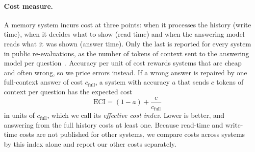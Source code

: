 \paragraph{Cost measure.}
A memory system incurs cost at three points: when it processes the history (write time), when it decides what to show (read time) and when the answering model reads what it was shown (answer time).
Only the last is reported for every system in public re-evaluations, as the number of tokens of context sent to the answering model per question~\citep{omnimemeval2026}.
Accuracy per unit of cost rewards systems that are cheap and often wrong, so we price errors instead.
If a wrong answer is repaired by one full-context answer of cost $c_\text{full}$, a system with accuracy $a$ that sends $c$ tokens of context per question has the expected cost
\begin{equation}
\label{eq:eci}
\mathrm{ECI} = (1-a) + \frac{c}{c_\text{full}}
\end{equation}
in units of $c_\text{full}$, which we call its \emph{effective cost index}.
Lower is better, and answering from the full history costs at least one.
Because read-time and write-time costs are not published for other systems, we compare costs across systems by this index alone and report our other costs separately.

